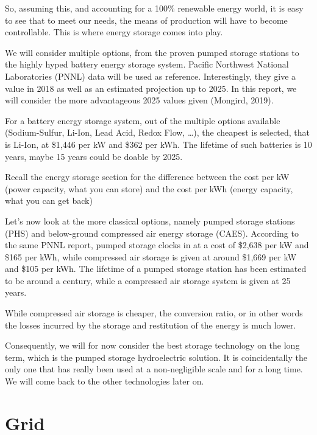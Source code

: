 So, assuming this, and accounting for a 100\% renewable energy world, it is easy to see that to meet our needs, the means of production will have to become controllable. This is where energy storage comes into play.

We will consider multiple options, from the proven pumped storage stations to the highly hyped battery energy storage system. Pacific Northwest National Laboratories (PNNL) data will be used as reference. Interestingly, they give a value in 2018 as well as an estimated projection up to 2025. In this report, we will consider the more advantageous 2025 values given (Mongird, 2019).

For a battery energy storage system, out of the multiple options available (Sodium-Sulfur, Li-Ion, Lead Acid, Redox Flow, \ldots), the cheapest is selected, that is Li-Ion, at \$1,446  per kW and \$362 per kWh. The lifetime of such batteries is 10 years, maybe 15 years could be doable by 2025.

\begin{kaobox}[frametitle=Energy storage: kW versus kWh]
Recall the energy storage section for the difference between the cost per kW (power capacity, what you can store) and the cost per kWh (energy capacity, what you can get back)
\end{kaobox}


Let’s now look at the more classical options, namely pumped storage stations (PHS) and below-ground compressed air energy storage (CAES). According to the same PNNL report, pumped storage clocks in at a cost of \$2,638 per kW and \$165 per kWh, while compressed air storage is given at around \$1,669 per kW and \$105 per kWh. The lifetime of a pumped storage station has been estimated to be around a century, while a compressed air storage system is given at 25 years.

While compressed air storage is cheaper, the conversion ratio, or in other words the losses incurred by the storage and restitution of the energy is much lower.

Consequently, we will for now consider the best storage technology on the long term, which is the pumped storage hydroelectric solution. It is coincidentally the only one that has really been used at a non-negligible scale and for a long time. We will come back to the other technologies later on.


\section{Grid}

